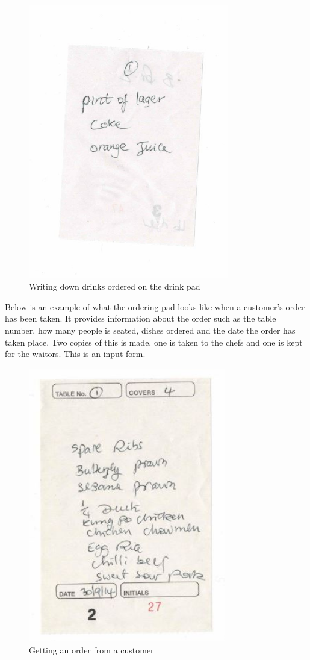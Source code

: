 \begin{figure}[H]
    \includegraphics[height = 12cm]{./Analysis/DrinkPad}
    \caption{Writing down drinks ordered on the drink pad} \label{fig:order_pad}
\end{figure}
\newpage

Below is an example of what the ordering pad looks like when a customer's order has been taken. It provides information about the order such as the table number, how many people is seated, dishes ordered and the date the order has taken place. Two copies of this is made, one is taken to the chefs and one is kept for the waitors. This is an input form.


\begin{figure}[H]
    \includegraphics[height = 12cm]{./Analysis/DishPad}
    \caption{Getting an order from a customer} \label{fig:order_pad}
\end{figure}


